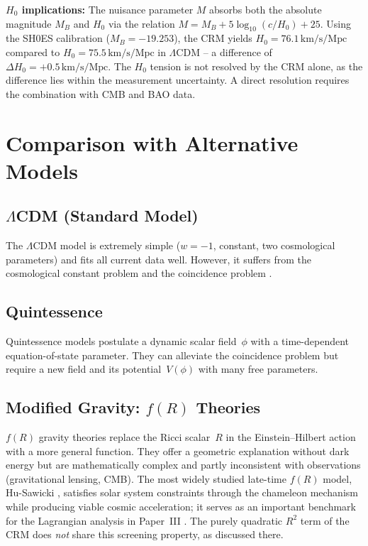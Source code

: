 \documentclass[aps,prd,twocolumn,superscriptaddress,nofootinbib]{revtex4-2}
\begin{document}
\textbf{$H_0$ implications:} The nuisance parameter $M$ absorbs both the absolute magnitude $M_B$ and $H_0$ via the relation $M = M_B + 5\log_{10}(c/H_0) + 25$. Using the SH0ES calibration ($M_B = -19.253$), the CRM yields $H_0 = 76.1\,\mathrm{km/s/Mpc}$ compared to $H_0 = 75.5\,\mathrm{km/s/Mpc}$ in $\Lambda$CDM -- a difference of $\Delta H_0 = +0.5\,\mathrm{km/s/Mpc}$. The $H_0$ tension is not resolved by the CRM alone, as the difference lies within the measurement uncertainty. A direct resolution requires the combination with CMB and BAO data.


\section{Comparison with Alternative Models}
\label{sec:alternatives}

\subsection{$\Lambda$CDM (Standard Model)}

The $\Lambda$CDM model is extremely simple ($w = -1$, constant, two cosmological parameters) and fits all current data well. However, it suffers from the cosmological constant problem and the coincidence problem \cite{Weinberg1989}.

\subsection{Quintessence}

Quintessence models \cite{Caldwell1998} postulate a dynamic scalar field~$\phi$ with a time-dependent equation-of-state parameter. They can alleviate the coincidence problem but require a new field and its potential~$V(\phi)$ with many free parameters.

\subsection{Modified Gravity: $f(R)$ Theories}

$f(R)$ gravity theories \cite{Starobinsky1980, Sotiriou2010} replace the Ricci scalar~$R$ in the Einstein--Hilbert action with a more general function. They offer a geometric explanation without dark energy but are mathematically complex and partly inconsistent with observations (gravitational lensing, CMB). The most widely studied late-time $f(R)$ model, Hu-Sawicki \cite{HuSawicki2007}, satisfies solar system constraints through the chameleon mechanism while producing viable cosmic acceleration; it serves as an important benchmark for the Lagrangian analysis in Paper~III \cite{Geiger2026c}. The purely quadratic $R^2$ term of the CRM does \textit{not} share this screening property, as discussed there.
\end{document}
